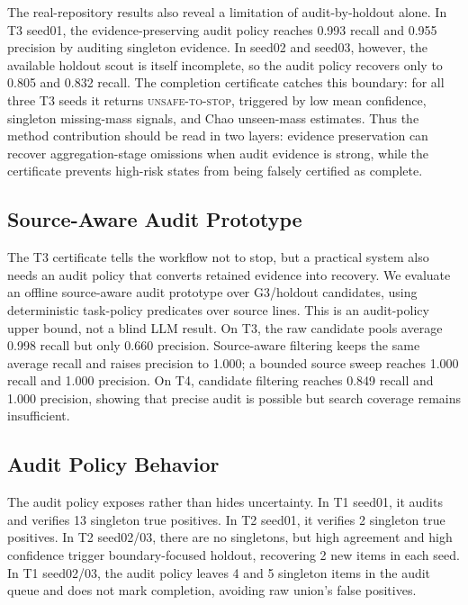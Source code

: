 \documentclass[letterpaper]{article}
\begin{document}
The real-repository results also reveal a limitation of audit-by-holdout alone.
In T3 seed01, the evidence-preserving audit policy reaches 0.993 recall and 0.955
precision by auditing singleton evidence. In seed02 and seed03, however, the
available holdout scout is itself incomplete, so the audit policy recovers only to
0.805 and 0.832 recall. The completion certificate catches this boundary: for
all three T3 seeds it returns \textsc{unsafe-to-stop}, triggered by low mean
confidence, singleton missing-mass signals, and Chao unseen-mass estimates.
Thus the method contribution should be read in two layers: evidence preservation
can recover aggregation-stage omissions when audit evidence is strong, while the
certificate prevents high-risk states from being falsely certified as complete.

\subsection{Source-Aware Audit Prototype}

The T3 certificate tells the workflow not to stop, but a practical system also
needs an audit policy that converts retained evidence into recovery. We evaluate
an offline source-aware audit prototype over G3/holdout candidates, using
deterministic task-policy predicates over source lines. This is an audit-policy
upper bound, not a blind LLM result. On T3, the raw candidate pools average 0.998
recall but only 0.660 precision. Source-aware filtering keeps the same average
recall and raises precision to 1.000; a bounded source sweep reaches 1.000 recall
and 1.000 precision. On T4, candidate filtering reaches 0.849 recall and 1.000
precision, showing that precise audit is possible but search coverage remains
insufficient.

\subsection{Audit Policy Behavior}

The audit policy exposes rather than hides uncertainty. In T1 seed01, it audits and
verifies 13 singleton true positives. In T2 seed01, it verifies 2 singleton true
positives. In T2 seed02/03, there are no singletons, but high agreement and high
confidence trigger boundary-focused holdout, recovering 2 new items in each
seed. In T1 seed02/03, the audit policy leaves 4 and 5 singleton items in the audit
queue and does not mark completion, avoiding raw union's false positives.
\end{document}
